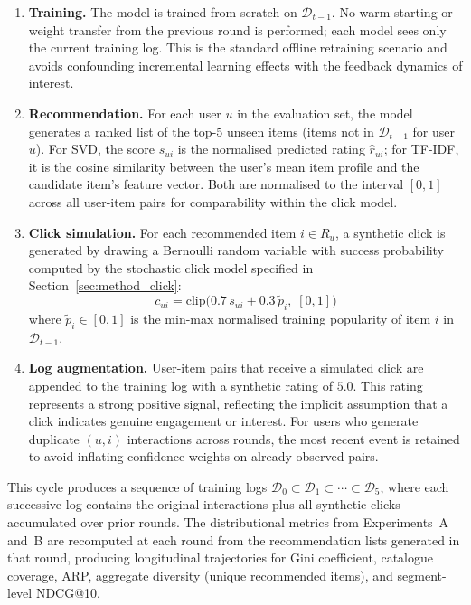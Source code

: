 \documentclass[11pt,a4paper]{report}
\begin{document}
\begin{enumerate}
  \item \textbf{Training.} The model is trained from scratch on $\mathcal{D}_{t-1}$. No warm-starting or weight transfer from the previous round is performed; each model sees only the current training log. This is the standard offline retraining scenario and avoids confounding incremental learning effects with the feedback dynamics of interest.

  \item \textbf{Recommendation.} For each user $u$ in the evaluation set, the model generates a ranked list of the top-5 unseen items (items not in $\mathcal{D}_{t-1}$ for user $u$). For SVD, the score $s_{ui}$ is the normalised predicted rating $\hat{r}_{ui}$; for TF-IDF, it is the cosine similarity between the user's mean item profile and the candidate item's feature vector. Both are normalised to the interval $[0, 1]$ across all user-item pairs for comparability within the click model.

  \item \textbf{Click simulation.} For each recommended item $i \in R_u$, a synthetic click is generated by drawing a Bernoulli random variable with success probability computed by the stochastic click model specified in Section~\ref{sec:method_click}:
  \begin{equation}
    \label{eq:click}
    c_{ui} = \mathrm{clip}\bigl(0.7\, s_{ui} + 0.3\, \tilde{p}_i,\; [0, 1]\bigr)
  \end{equation}
  where $\tilde{p}_i \in [0, 1]$ is the min-max normalised training popularity of item $i$ in $\mathcal{D}_{t-1}$.

  \item \textbf{Log augmentation.} User-item pairs that receive a simulated click are appended to the training log with a synthetic rating of $5.0$. This rating represents a strong positive signal, reflecting the implicit assumption that a click indicates genuine engagement or interest. For users who generate duplicate $(u, i)$ interactions across rounds, the most recent event is retained to avoid inflating confidence weights on already-observed pairs.
\end{enumerate}

This cycle produces a sequence of training logs $\mathcal{D}_0 \subset \mathcal{D}_1 \subset \cdots \subset \mathcal{D}_5$, where each successive log contains the original interactions plus all synthetic clicks accumulated over prior rounds. The distributional metrics from Experiments~A and~B are recomputed at each round from the recommendation lists generated in that round, producing longitudinal trajectories for Gini coefficient, catalogue coverage, ARP, aggregate diversity (unique recommended items), and segment-level NDCG@10.
\end{document}
